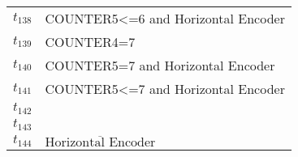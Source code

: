\begin{table}[H]
\begin{tabular}{M{5cm}M{10cm}}
\hyperlink{partialNet:t1381}{\hypertarget{partialTable:t138}{$t_{138}$}} & COUNTER5<=6 and Horizontal Encoder\\
\hyperlink{partialNet:t1391}{\hypertarget{partialTable:t139}{$t_{139}$}} & COUNTER4=7\\
\hyperlink{partialNet:t1401}{\hypertarget{partialTable:t140}{$t_{140}$}} & COUNTER5=7 and Horizontal Encoder\\
\hyperlink{partialNet:t1411}{\hypertarget{partialTable:t141}{$t_{141}$}} & COUNTER5<=7 and Horizontal Encoder\\
\hyperlink{partialNet:t1421}{\hypertarget{partialTable:t142}{$t_{142}$}} & \\
\hyperlink{partialNet:t1431}{\hypertarget{partialTable:t143}{$t_{143}$}} & \\
\hyperlink{partialNet:t1441}{\hypertarget{partialTable:t144}{$t_{144}$}} & \(\overline{\mbox{Horizontal Encoder}}\)\\
\end{tabular}
\end{table}
